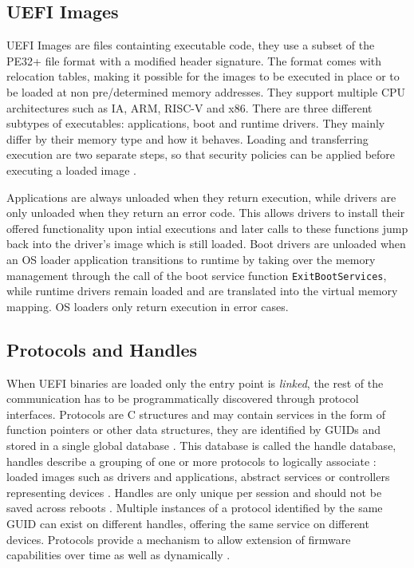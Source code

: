 \subsection{\acs{UEFI} Images}

\ac{UEFI} Images are files containting executable code, they use a subset of the \ac{PE32}+ file format with a modified header signature.
The format comes with relocation tables, making it possible for the images to be executed in place or to be loaded at non pre\-/determined memory addresses.
They support multiple CPU architectures such as IA, ARM, RISC-V and x86.
There are three different subtypes of executables: applications, boot and runtime drivers. They mainly differ by their memory type and how it behaves.
Loading and transferring execution are two separate steps, so that security policies can be applied before executing a loaded image \cite[2.1.1]{uefi-spec}.

Applications are always unloaded when they return execution, while drivers are only unloaded when they return an error code. This allows drivers to install their offered functionality upon intial executions and later calls to these functions jump back into the driver's image which is still loaded.
Boot drivers are unloaded when an \ac{OS} loader application transitions to runtime by taking over the memory management through the call of the boot service function \lstinline{ExitBootServices}, while runtime drivers remain loaded and are translated into the virtual memory mapping. \ac{OS} loaders only return execution in error cases.


\subsection{Protocols and Handles}

When \ac{UEFI} binaries are loaded only the entry point is \emph{linked}, the rest of the communication has to be programmatically discovered through protocol interfaces.
Protocols are C structures and may contain services in the form of function pointers or other data structures, they are identified by \acp{GUID} and stored in a single global database \cite{beyond-bios}.
This database is called the handle database, handles describe a grouping of one or more protocols to logically associate \cite[3.6]{tianocore-edk2-driver-writer-s-guide}: loaded images such as drivers and applications, abstract services or controllers representing devices \cite[3.4]{tianocore-edk2-driver-writer-s-guide}.
Handles are only unique per session and should not be saved across reboots \cite{beyond-bios}.
Multiple instances of a protocol identified by the same \ac{GUID} can exist on different handles, offering the same service on different devices.
Protocols provide a mechanism to allow extension of firmware capabilities over time as well as dynamically \cite[3.6]{tianocore-edk2-driver-writer-s-guide}.

